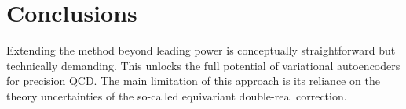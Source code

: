 \section{Conclusions}\label{sec:conclusions}

Extending the method beyond leading power is conceptually
straightforward but technically demanding. This unlocks the full
potential of variational autoencoders for precision QCD. The main
limitation of this approach is its reliance on the theory uncertainties
of the so-called equivariant double-real correction.

